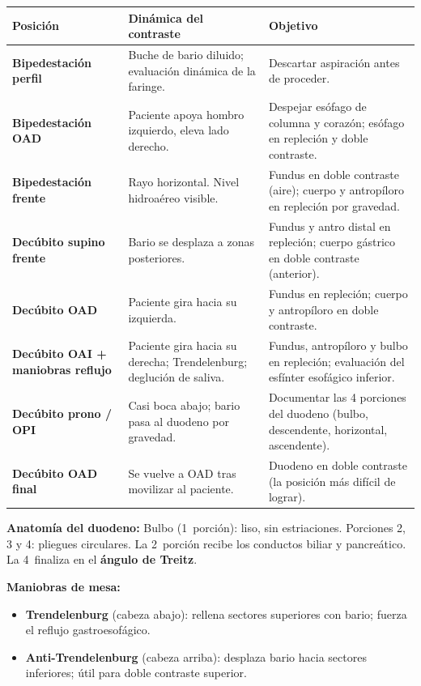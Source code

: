 {\renewcommand{\arraystretch}{1.35}
	\begin{center}
		\begin{tabular}{>{\bfseries}p{3.5cm} p{5cm} p{5cm}}
			\hline
			\textbf{Posición} & \textbf{Dinámica del contraste} & \textbf{Objetivo} \\
			\hline
			Bipedestación perfil & Buche de bario diluido; evaluación dinámica de la faringe. & Descartar aspiración antes de proceder. \\[0.5em]
			\hline
			Bipedestación OAD & Paciente apoya hombro izquierdo, eleva lado derecho. & Despejar esófago de columna y corazón; esófago en repleción y doble contraste. \\[0.5em]
			\hline
			Bipedestación frente & Rayo horizontal. Nivel hidroaéreo visible. & Fundus en doble contraste (aire); cuerpo y antropíloro en repleción por gravedad. \\[0.5em]
			\hline
			Decúbito supino frente & Bario se desplaza a zonas posteriores. & Fundus y antro distal en repleción; cuerpo gástrico en doble contraste (anterior). \\[0.5em]
			\hline
			Decúbito OAD & Paciente gira hacia su izquierda. & Fundus en repleción; cuerpo y antropíloro en doble contraste. \\[0.5em]
			\hline
			Decúbito OAI + maniobras reflujo & Paciente gira hacia su derecha; Trendelenburg; deglución de saliva. & Fundus, antropíloro y bulbo en repleción; evaluación del esfínter esofágico inferior. \\[0.5em]
			\hline
			Decúbito prono / OPI & Casi boca abajo; bario pasa al duodeno por gravedad. & Documentar las 4 porciones del duodeno (bulbo, descendente, horizontal, ascendente). \\[0.5em]
			\hline
			Decúbito OAD final & Se vuelve a OAD tras movilizar al paciente. & Duodeno en doble contraste (la posición más difícil de lograr). \\
			\hline
		\end{tabular}
	\end{center}
}

\begin{cajakeypoints}
	\textbf{Anatomía del duodeno:} Bulbo (1\textordfeminine\ porción): liso, sin estriaciones. Porciones 2, 3 y 4: pliegues circulares. La 2\textordfeminine\ porción recibe los conductos biliar y pancreático. La 4\textordfeminine\ finaliza en el \textbf{ángulo de Treitz}.
\end{cajakeypoints}

\textbf{Maniobras de mesa:}
\begin{itemize}[noitemsep]
	\item \textbf{Trendelenburg} (cabeza abajo): rellena sectores superiores con bario; fuerza el reflujo gastroesofágico.
	\item \textbf{Anti-Trendelenburg} (cabeza arriba): desplaza bario hacia sectores inferiores; útil para doble contraste superior.
\end{itemize}


